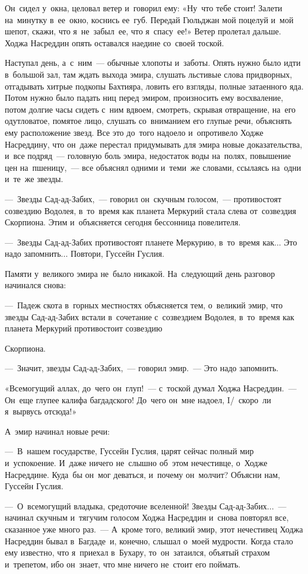 \documentclass[12pt,a4paper]{book}
\begin{document}
Он~сидел у~окна, целовал ветер и~говорил ему: «Ну~что тебе стоит! Залети на~минутку в~ее~окно, коснись ее~губ. Передай Гюльджан мой поцелуй и~мой шепот, скажи, что я~не~забыл~ее, что я~спасу~ее!» Ветер пролетал дальше. Ходжа Насреддин опять оставался наедине со~своей тоской.

Наступал день, а~с~ним~— обычные хлопоты и~заботы. Опять нужно было идти в~большой зал, там ждать выхода эмира, слушать льстивые слова придворных, отгадывать хитрые подкопы Бахтияра, ловить его взгляды, полные затаенного яда. Потом нужно было падать ниц перед эмиром, произносить ему восхваление, потом долгие часы сидеть с~ним вдвоем, смотреть, скрывая отвращение, на~его одутловатое, помятое лицо, слушать со~вниманием его глупые речи, объяснять ему расположение звезд. Все это до~того надоело и~опротивело Ходже Насреддину, что он~даже перестал придумывать для эмира новые доказательства, и~все подряд~— головную боль эмира, недостаток воды на~полях, повышение цен на~пшеницу,~— все объяснял одними и~теми~же словами, ссылаясь на~одни и~те~же звезды.

—~Звезды Сад-ад-Забих,~— говорил он~скучным голосом,~— противостоят созвездию Водолея, в~то~время как планета Меркурий стала слева от~созвездия Скорпиона. Этим и~объясняется сегодня бессонница повелителя.

—~Звезды Сад-ад-Забих противостоят планете Меркурию, в~то~время как... Это надо запомнить... Повтори, Гуссейн Гуслия.

Памяти у~великого эмира не~было никакой. На~следующий день разговор начинался снова:

—~Падеж скота в~горных местностях объясняется тем, о~великий эмир, что звезды Сад-ад-Забих встали в~сочетание с~созвездием Водолея, в~то~время как планета Меркурий противостоит созвездию

Скорпиона.

—~Значит, звезды Сад-ад-Забих,~— говорил эмир.~— Это надо запомнить.

«Всемогущий аллах, до~чего он~глуп!~— с~тоской думал Ходжа Насреддин.~— Он~еще глупее калифа багдадского! До~чего он~мне надоел, I/~скоро~ли я~вырвусь отсюда!»

А~эмир начинал новые речи:

—~В~нашем государстве, Гуссейн Гуслия, царят сейчас полный мир и~успокоение. И~даже ничего не~слышно об~этом нечестивце, о~Ходже Насреддине. Куда~бы он~мог деваться, и~почему он~молчит? Объясни нам, Гуссейн Гуслия.

—~О~всемогущий владыка, средоточие вселенной! Звезды Сад-ад-Забих...~— начинал скучным и~тягучим голосом Ходжа Насреддин и~снова повторял все, сказанное уже много раз.~— А~кроме того, великий эмир, этот нечестивец Ходжа Насреддин бывал в~Багдаде~и, конечно, слышал о~моей мудрости. Когда стало ему известно, что я~приехал в~Бухару, то~он~затаился, объятый страхом и~трепетом, ибо он~знает, что мне ничего не~стоит его поймать.
\end{document}
